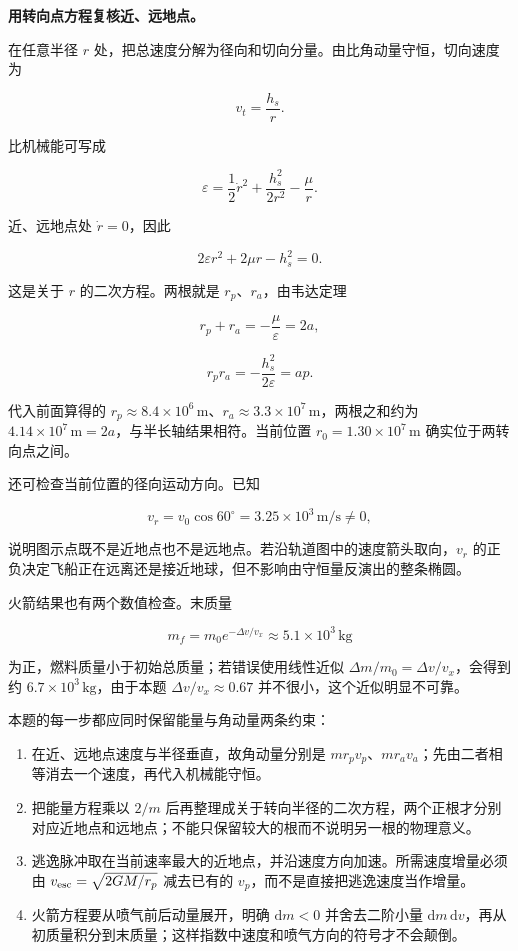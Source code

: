 \documentclass[12pt,a4paper,UTF8]{ctexart}
\newcommand{\tightlist}{\setlength{\itemsep}{0pt}\setlength{\parskip}{0pt}}
\begin{document}
\textbf{用转向点方程复核近、远地点。}

在任意半径 \(r\)
处，把总速度分解为径向和切向分量。由比角动量守恒，切向速度为

\[v_t=\frac{h_s}{r}.\]

比机械能可写成

\[\varepsilon=\frac12\dot r^2+\frac{h_s^2}{2r^2}-\frac\mu r.\]

近、远地点处 \(\dot r=0\)，因此

\[2\varepsilon r^2+2\mu r-h_s^2=0.\]

这是关于 \(r\) 的二次方程。两根就是 \(r_p\)、\(r_a\)，由韦达定理

\[r_p+r_a=-\frac{\mu}{\varepsilon}=2a,\]

\[r_pr_a=-\frac{h_s^2}{2\varepsilon}=ap.\]

代入前面算得的
\(r_p\approx8.4\times10^6\,\mathrm m\)、\(r_a\approx3.3\times10^7\,\mathrm m\)，两根之和约为
\(4.14\times10^7\,\mathrm m=2a\)，与半长轴结果相符。当前位置
\(r_0=1.30\times10^7\,\mathrm m\) 确实位于两转向点之间。

还可检查当前位置的径向运动方向。已知

\[v_r=v_0\cos60^\circ=3.25\times10^3\,\mathrm{m/s}\ne0,\]

说明图示点既不是近地点也不是远地点。若沿轨道图中的速度箭头取向，\(v_r\)
的正负决定飞船正在远离还是接近地球，但不影响由守恒量反演出的整条椭圆。

火箭结果也有两个数值检查。末质量

\[m_f=m_0e^{-\Delta v/v_x}\approx5.1\times10^3\,\mathrm{kg}\]

为正，燃料质量小于初始总质量；若错误使用线性近似
\(\Delta m/m_0=\Delta v/v_x\)，会得到约
\(6.7\times10^3\,\mathrm{kg}\)，由于本题 \(\Delta v/v_x\approx0.67\)
并不很小，这个近似明显不可靠。

本题的每一步都应同时保留能量与角动量两条约束：

\begin{enumerate}
\def\labelenumi{\arabic{enumi}.}
\tightlist
\item
  在近、远地点速度与半径垂直，故角动量分别是
  \(mr_pv_p\)、\(mr_av_a\)；先由二者相等消去一个速度，再代入机械能守恒。
\item
  把能量方程乘以 \(2/m\)
  后再整理成关于转向半径的二次方程，两个正根才分别对应近地点和远地点；不能只保留较大的根而不说明另一根的物理意义。
\item
  逃逸脉冲取在当前速率最大的近地点，并沿速度方向加速。所需速度增量必须由
  \(v_{\rm esc}=\sqrt{2GM/r_p}\) 减去已有的
  \(v_p\)，而不是直接把逃逸速度当作增量。
\item
  火箭方程要从喷气前后动量展开，明确 \(\mathrm dm<0\) 并舍去二阶小量
  \(\mathrm dm\,\mathrm dv\)，再从初质量积分到末质量；这样指数中速度和喷气方向的符号才不会颠倒。
\end{enumerate}
\end{document}
